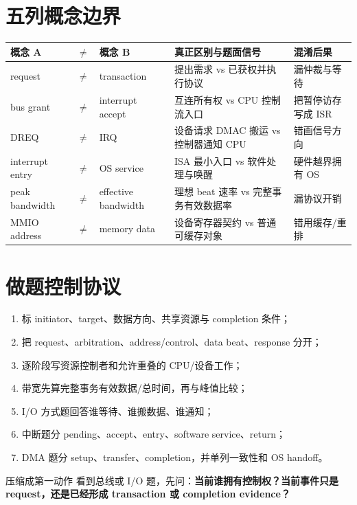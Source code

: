 \documentclass[UTF8,fontset=fandol,11pt,a4paper]{ctexart}
\newcommand{\kw}[1]{\textbf{\color{deep}#1}}
\begin{document}
\section{五列概念边界}
\begin{center}\small
\begin{tabularx}{\linewidth}{L{1.8cm}C{0.35cm}L{1.9cm}YY}\toprule
概念 A & $\neq$ & 概念 B & 真正区别与题面信号 & 混淆后果\\\midrule
request & $\neq$ & transaction & 提出需求 vs 已获权并执行协议 & 漏仲裁与等待\\
bus grant & $\neq$ & interrupt accept & 互连所有权 vs CPU 控制流入口 & 把暂停访存写成 ISR\\
DREQ & $\neq$ & IRQ & 设备请求 DMAC 搬运 vs 控制器通知 CPU & 错画信号方向\\
interrupt entry & $\neq$ & OS service & ISA 最小入口 vs 软件处理与唤醒 & 硬件越界拥有 OS\\
peak bandwidth & $\neq$ & effective bandwidth & 理想 beat 速率 vs 完整事务有效数据率 & 漏协议开销\\
MMIO address & $\neq$ & memory data & 设备寄存器契约 vs 普通可缓存对象 & 错用缓存/重排\\
\bottomrule
\end{tabularx}
\end{center}

\section{做题控制协议}
\begin{enumerate}
\item 标 initiator、target、数据方向、共享资源与 completion 条件；
\item 把 request、arbitration、address/control、data beat、response 分开；
\item 逐阶段写资源控制者和允许重叠的 CPU/设备工作；
\item 带宽先算完整事务有效数据/总时间，再与峰值比较；
\item I/O 方式题回答谁等待、谁搬数据、谁通知；
\item 中断题分 pending、accept、entry、software service、return；
\item DMA 题分 setup、transfer、completion，并单列一致性和 OS handoff。
\end{enumerate}

\begin{methodbox}{压缩成第一动作}
看到总线或 I/O 题，先问：\kw{当前谁拥有控制权？当前事件只是 request，还是已经形成 transaction 或 completion evidence？}
\end{methodbox}
\end{document}
